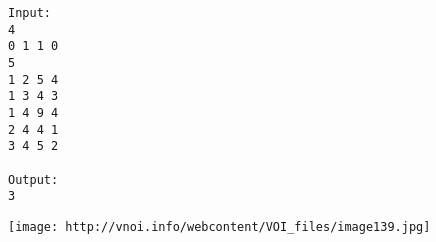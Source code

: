 \begin{verbatim}
Input:
4
0 1 1 0
5
1 2 5 4
1 3 4 3
1 4 9 4
2 4 4 1
3 4 5 2

Output:
3

\end{verbatim}


\texttt{[image: http://vnoi.info/webcontent/VOI\_files/image139.jpg]}